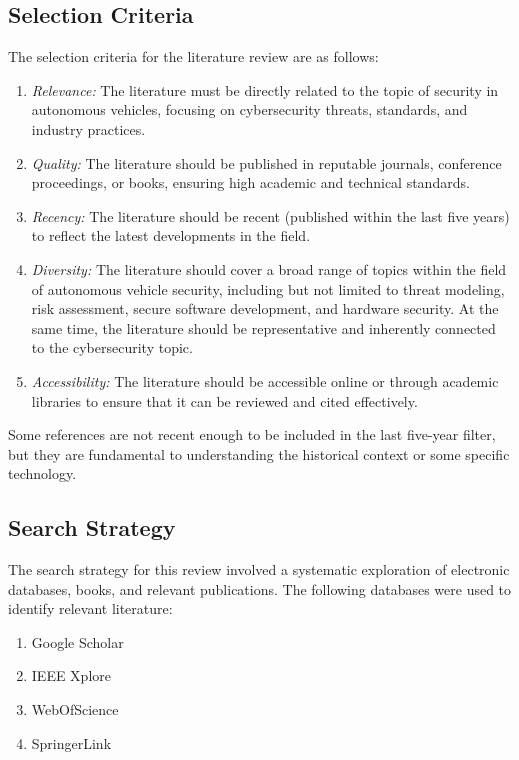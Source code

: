 \subsection{Selection Criteria}\label{subsec:selection-criteria}

The selection criteria for the literature review are as follows:
\begin{enumerate}
    \item \textit{Relevance:} The literature must be directly related to the topic of security in autonomous vehicles, focusing on cybersecurity threats, standards, and industry practices.
    \item \textit{Quality:} The literature should be published in reputable journals, conference proceedings, or books, ensuring high academic and technical standards.
    \item \textit{Recency:} The literature should be recent (published within the last five years) to reflect the latest developments in the field.
    \item \textit{Diversity:} The literature should cover a broad range of topics within the field of autonomous vehicle security, including but not limited to threat modeling, risk assessment, secure software development, and hardware security.
    At the same time, the literature should be representative and inherently connected to the cybersecurity topic.
    \item \textit{Accessibility:} The literature should be accessible online or through academic libraries to ensure that it can be reviewed and cited effectively.
\end{enumerate}

Some references are not recent enough to be included in the last five-year filter, but they are fundamental to understanding the historical context or some specific technology.

\subsection{Search Strategy}\label{subsec:search-strategy}

The search strategy for this review involved a systematic exploration of electronic databases, books, and relevant publications.
The following databases were used to identify relevant literature:

\begin{enumerate}
    \item Google Scholar
    \item IEEE Xplore
    \item WebOfScience
    \item SpringerLink
\end{enumerate}

